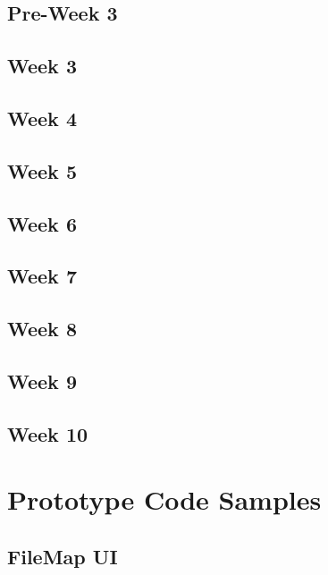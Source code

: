 \documentclass[letterpaper,10pt,titlepage,draftclsnofoot,onecolumn,onesided] {IEEEtran}
\begin{document}
	\subsection{Pre-Week 3}

	\subsection{Week 3}

	\subsection{Week 4}

	\subsection{Week 5}

	\subsection{Week 6}

	\subsection{Week 7}

	\subsection{Week 8}

	\subsection{Week 9}

	\subsection{Week 10}

\section{Prototype Code Samples}
	
	\subsection{FileMap UI}
	\begin{lstlisting}

	\end{lstlisting}
\end{document}
